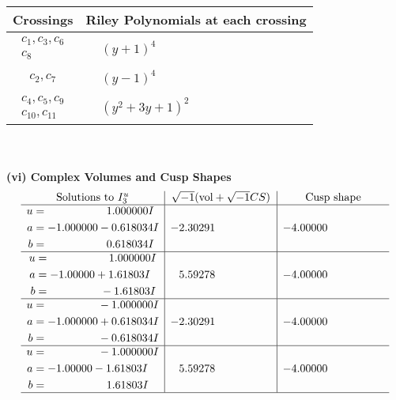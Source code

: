 \documentclass[1p]{elsarticle_modified}
\theoremstyle{definition}
\newcommand{\I}{\sqrt{-1}}
\begin{document}
\begin{tabular}{m{50pt}|m{274pt}}
Crossings & \hspace{64pt}Riley Polynomials at each crossing \\
\hline $$\begin{aligned}c_{1},c_{3},c_{6}\\c_{8}\end{aligned}$$&$\begin{aligned}
&(y+1)^4
\end{aligned}$\\
\hline $$\begin{aligned}c_{2},c_{7}\end{aligned}$$&$\begin{aligned}
&(y-1)^4
\end{aligned}$\\
\hline $$\begin{aligned}c_{4},c_{5},c_{9}\\c_{10},c_{11}\end{aligned}$$&$\begin{aligned}
&(y^2+3 y+1)^2
\end{aligned}$\\
\hline
\end{tabular}\\~\\
\newpage\flushleft \textbf{(vi) Complex Volumes and Cusp Shapes}
$$\begin{array}{c|c|c}  
\text{Solutions to }I^u_{3}& \I (\text{vol} + \sqrt{-1}CS) & \text{Cusp shape}\\
 \hline 
\begin{aligned}
u &= \phantom{-0.000000 -}1.000000 I \\
a &= -1.000000 - 0.618034 I \\
b &= \phantom{-0.000000 -}0.618034 I\end{aligned}
 & -2.30291\phantom{ +0.000000I} & -4.00000\phantom{ +0.000000I} \\ \hline\begin{aligned}
u &= \phantom{-0.000000 -}1.000000 I \\
a &= -1.00000 + 1.61803 I \\
b &= \phantom{-0.000000 } -1.61803 I\end{aligned}
 & \phantom{-}5.59278\phantom{ +0.000000I} & -4.00000\phantom{ +0.000000I} \\ \hline\begin{aligned}
u &= \phantom{-0.000000 } -1.000000 I \\
a &= -1.000000 + 0.618034 I \\
b &= \phantom{-0.000000 } -0.618034 I\end{aligned}
 & -2.30291\phantom{ +0.000000I} & -4.00000\phantom{ +0.000000I} \\ \hline\begin{aligned}
u &= \phantom{-0.000000 } -1.000000 I \\
a &= -1.00000 - 1.61803 I \\
b &= \phantom{-0.000000 -}1.61803 I\end{aligned}
 & \phantom{-}5.59278\phantom{ +0.000000I} & -4.00000\phantom{ +0.000000I}\\
 \hline 
 \end{array}$$\newpage
\end{document}
